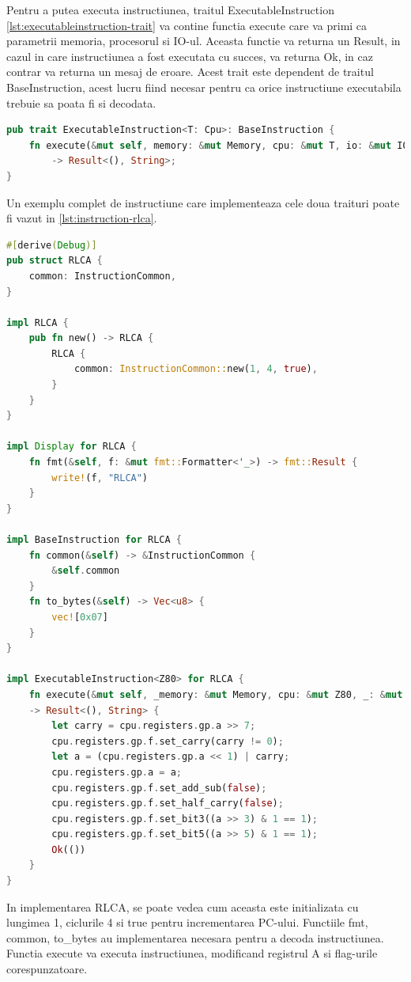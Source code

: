 \documentclass[titlepage,12pt]{article}
\DeclareRobustCommand{\code}[1]{{\ttfamily\small #1}}
\begin{document}
Pentru a putea executa instructiunea, traitul \code{ExecutableInstruction} \cref{lst:executableinstruction-trait} va contine functia execute care va primi ca parametrii memoria, procesorul si IO-ul. Aceasta functie va returna un \code{Result}, in cazul in care instructiunea a fost executata cu succes, va returna \code{Ok}, in caz contrar va returna un mesaj de eroare. Acest trait este dependent de traitul \code{BaseInstruction}, acest lucru fiind necesar pentru ca orice instructiune executabila trebuie sa poata fi si decodata.

\begin{lstlisting}[language=Rust,caption={Trait ExecutableInstruction},label={lst:executableinstruction-trait}]
pub trait ExecutableInstruction<T: Cpu>: BaseInstruction {
    fn execute(&mut self, memory: &mut Memory, cpu: &mut T, io: &mut IO)
        -> Result<(), String>;
}
\end{lstlisting}

Un exemplu complet de instructiune care implementeaza cele doua traituri poate fi vazut in \cref{lst:instruction-rlca}.
\begin{lstlisting}[language=Rust,caption={Exemplu instructiune},label={lst:instruction-rlca}]
#[derive(Debug)]
pub struct RLCA {
    common: InstructionCommon,
}

impl RLCA {
    pub fn new() -> RLCA {
        RLCA {
            common: InstructionCommon::new(1, 4, true),
        }
    }
}

impl Display for RLCA {
    fn fmt(&self, f: &mut fmt::Formatter<'_>) -> fmt::Result {
        write!(f, "RLCA")
    }
}

impl BaseInstruction for RLCA {
    fn common(&self) -> &InstructionCommon {
        &self.common
    }
    fn to_bytes(&self) -> Vec<u8> {
        vec![0x07]
    }
}

impl ExecutableInstruction<Z80> for RLCA {
    fn execute(&mut self, _memory: &mut Memory, cpu: &mut Z80, _: &mut IO)
    -> Result<(), String> {
        let carry = cpu.registers.gp.a >> 7;
        cpu.registers.gp.f.set_carry(carry != 0);
        let a = (cpu.registers.gp.a << 1) | carry;
        cpu.registers.gp.a = a;
        cpu.registers.gp.f.set_add_sub(false);
        cpu.registers.gp.f.set_half_carry(false);
        cpu.registers.gp.f.set_bit3((a >> 3) & 1 == 1);
        cpu.registers.gp.f.set_bit5((a >> 5) & 1 == 1);
        Ok(())
    }
}
\end{lstlisting}

In implementarea \code{RLCA}, se poate vedea cum aceasta este initializata cu lungimea 1, ciclurile 4 si true pentru incrementarea PC-ului. Functiile \code{fmt}, \code{common}, \code{to\_bytes} au implementarea necesara pentru a decoda instructiunea.
Functia execute va executa instructiunea, modificand registrul A si flag-urile corespunzatoare.
\end{document}
